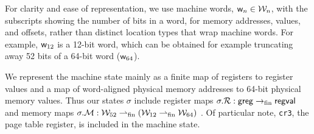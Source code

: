 For clarity and ease of representation, we use machine words, $\mathsf{w}_n \in \mathcal{W}_n$, with the subscripts showing the number of bits in a word,
for memory addresses, values, and offsets, rather than distinct location types that wrap machine words.
For example, $\mathsf{w}_{12}$ is a 12-bit word, which can be obtained for example truncating away 52 bits of a 64-bit word ($\mathsf{w}_{64}$).

\label{sec:state}
We represent the machine state mainly as a finite map of registers to register values and a map of word-aligned physical memory addresses 
to 64-bit physical memory values. 
Thus our states $\sigma$ include register maps $\sigma.\mathcal{R}: \mathsf{greg} \rightarrow_{\textrm{fin}} \mathsf{regval} $ and
memory maps $\sigma.\mathcal{M}: \mathcal{W}_{52} \rightharpoonup_{\textrm{fin}} (\mathcal{W}_{12} \rightharpoonup_{\textrm{fin}} \mathcal{W}_{64} )$
.
Of particular note, \lstinline|cr3|, the page table register, is included in the machine state.


